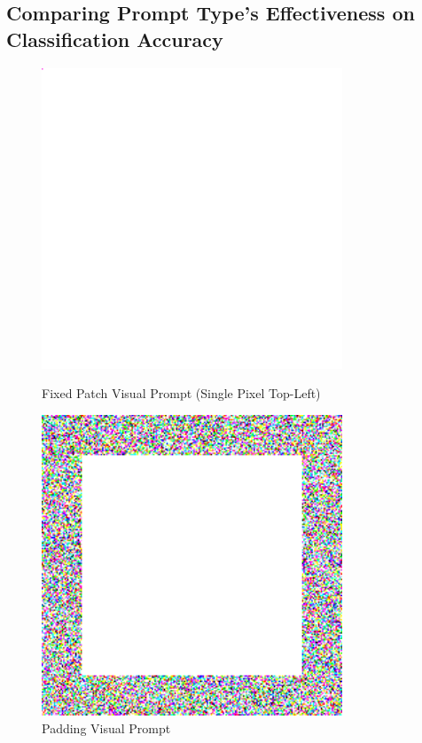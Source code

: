 \documentclass[a4paper]{article}
\begin{document}
\subsection{Comparing Prompt Type's Effectiveness on Classification Accuracy}
\begin{figure}[h]
    \centering
    \begin{minipage}[b]{0.45\textwidth}
        \centering
        \includegraphics[width=0.8\textwidth]{"imgs/prompt_fixed_patch.png"}
        \caption{Fixed Patch Visual Prompt (Single Pixel Top-Left)}
        \label{fig:prompt-fixed}
    \end{minipage}
    \hfill
    \begin{minipage}[b]{0.45\textwidth}
        \centering
        \includegraphics[width=0.8\textwidth]{"imgs/prompt_padding.png"}
        \caption{Padding Visual Prompt}
        \label{fig:prompt-padding}
    \end{minipage}
\end{figure}
\end{document}
